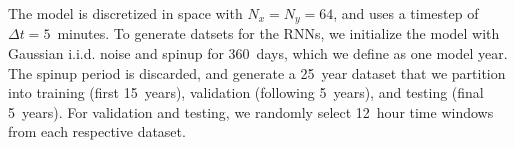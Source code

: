 The model is discretized in space with $N_x = N_y = 64$, and uses a timestep of
$\Delta t=5$~minutes.
To generate datsets for the RNNs, we initialize the model with Gaussian i.i.d.
noise and spinup for 360~days, which we define as one model year.
The spinup period is discarded, and generate a 25~year dataset that we partition
into training (first 15~years), validation (following 5~years), and testing
(final 5~years).
For validation and testing, we randomly select 12~hour time windows from each
respective dataset.
